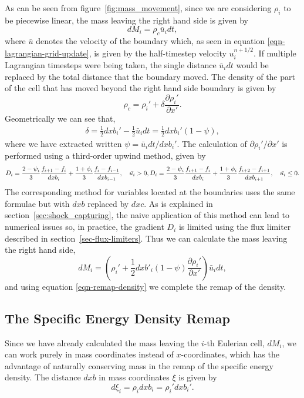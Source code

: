 As can be seen from figure~\ref{fig:mass_movement}, since we are considering $\rho_i$ to be piecewise linear, the mass leaving the right hand side is given by
\begin{equation}
  dM_i = \rho_c \bar{u}_i dt,
\end{equation}
where $\bar{u}$ denotes the velocity of the boundary which, as seen in equation \eqref{eqn-lagrangian-grid-update}, is given by the half-timestep velocity $u_i^{n+1/2}$. If multiple Lagrangian timesteps were being taken, the single distance $\bar{u}_i dt$ would be replaced by the total distance that the boundary moved. The density of the part of the cell that has moved beyond the right hand side boundary is given by
\begin{equation}
  \rho_c = \rho_i' + \delta \frac{\partial \rho_i'}{\partial x'}.
\end{equation}
Geometrically we can see that,
\begin{align}
  \delta =  \frac{1}{2} dxb_i' - \frac{1}{2} \bar{u}_i dt = \frac{1}{2} dxb_i'(1-\psi),
\end{align}
where we have extracted  written $\psi = \bar{u}_i dt / dxb_i'$. The calculation of $\partial\rho_i'/ \partial x'$ is performed using a third-order upwind method, given by
\begin{equation}
  \label{eq:upwind_method}
D_i = \frac{2-\psi_i}{3} \frac{f_{i+1} - f_i}{dxb_i} + \frac{1+\phi_i}{3}\frac{f_i - f_{i-1}}{dxb_{i-1}}, \quad \bar{u_i} > 0,\\
D_i = \frac{2-\psi_i}{3} \frac{f_{i+1} - f_i}{dxb_i} + \frac{1+\phi_i}{3}\frac{f_{i+2} - f_{i+1}}{dxb_{i+1}}, \quad \bar{u_i} \leq 0.
\end{equation}
The corresponding method for variables located at the boundaries uses the same formulae but with $dxb$ replaced by $dxc$. As is explained in section~\ref{sec:shock_capturing}, the naive application of this method can lead to numerical issues so, in practice, the gradient $D_i$ is limited using the flux limiter described in section~\ref{sec-flux-limiters}. Thus we can calculate the mass leaving the right hand side, 
\begin{equation}
dM_i = \left( \rho_i' + \frac{1}{2}dxb'_i(1-\psi) \frac{\partial \rho_i'}{\partial x'} \right) \bar{u}_i dt,
\label{eqn-remap-mass-diff}
\end{equation} 
and using equation \eqref{eqn-remap-density} we complete the remap of the density.

\subsection{The Specific Energy Density Remap}
Since we have already calculated the mass leaving the $i$-th Eulerian cell, $dM_i$, we can work purely in mass coordinates instead of $x$-coordinates, which has the advantage of naturally conserving mass in the remap of the specific energy density. The distance $dxb$ in mass coordinates $\xi$ is given by
\begin{equation}
  d\xi_i = \rho_i dxb_i = \rho_i' dxb_i'.
\end{equation}

